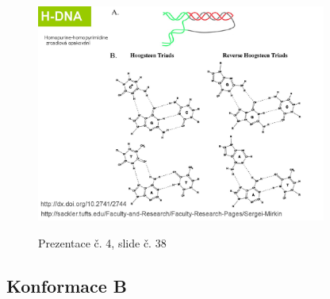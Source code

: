 \documentclass[DIV=8]{scrreprt}
\begin{document}
\begin{figure}
    \caption{Prezentace č. 4, slide č. 38}
    \includegraphics[width=0.85\textwidth]{slides-4/slide-38.jpg}
    \centering
    \label{slides-4-slide-38}
\end{figure}


\subsection{Konformace B} \label{Konformace B}
\end{document}
